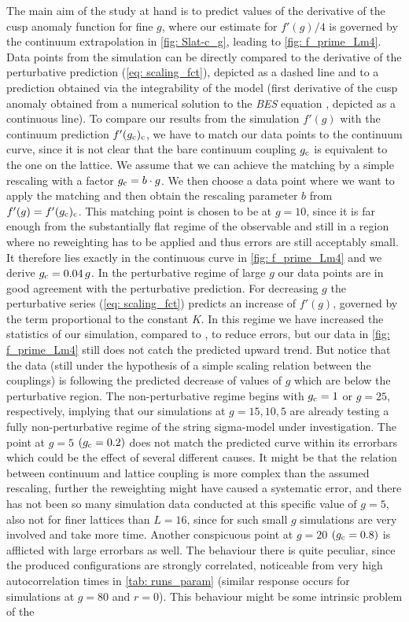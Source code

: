 The main aim of the study at hand is to predict values  of the derivative of the cusp anomaly function for fine $g$, where our estimate for $f'(g)/4$ is governed by the continuum extrapolation in \autoref{fig: Slat-c_g}, leading to \autoref{fig: f_prime_Lm4}. Data points from the simulation can be directly compared to the derivative of the perturbative prediction (\ref{eq: scaling_fct}), depicted as a dashed line and to a prediction obtained via the integrability of the model (first derivative of the cusp anomaly obtained from a numerical solution to the \textit{BES} equation \cite{Beisert:2006ez}, depicted as a continuous line). To compare our results from the simulation $f'(g)$ with the continuum prediction $f'(g_{\rm c})_{\rm c}$, we have to match our data points to the continuum curve, since it is not clear that the bare continuum coupling $g_{\rm c}$ is equivalent to the one on the lattice. We assume that we can achieve the matching by a simple rescaling with a factor $g_{\rm c}= b\cdot g$. We then choose a data point where we want to apply the matching and then obtain the rescaling parameter $b$ from $f'(g)=f'(g_{\rm c})_{\rm c}$. This matching point is chosen to be at $g=10$, since it is far enough from the substantially flat regime of the observable and still in a region where no reweighting has to be applied and thus errors are still acceptably small. It therefore lies exactly in the continuous curve in \autoref{fig: f_prime_Lm4} and we derive $g_{\rm c}=0.04 \,g$. In the perturbative regime of large $g$ our data points are in good agreement with the perturbative prediction. For decreasing $g$ the perturbative series (\ref{eq: scaling_fct}) predicts an increase of $f'(g)$, governed by the term proportional to the  constant $K$. In this regime we have increased the statistics of our simulation, compared to \cite{Bianchi:2016cyv}, to reduce errors, but our data in \autoref{fig: f_prime_Lm4} still does not catch the predicted upward trend. But notice that the data (still under the hypothesis of a simple scaling relation between the couplings) is following the predicted decrease of values of $g$ which are below the perturbative region. The non-perturbative regime begins with $g_{\rm c}=1$ or $g=25$, respectively, implying that our simulations at $g=15,10,5$ are already testing a fully non-perturbative regime of the string sigma-model under investigation. The point at $g=5$ $(g_{\rm c}=0.2)$ does not match the predicted curve within its errorbars which could be the effect of several different causes. It might be that the relation between continuum and lattice coupling is more complex than the assumed rescaling, further the reweighting might have caused a systematic error, and there has not been so many simulation data conducted at this specific value of $g=5$, also not for finer lattices than $L=16$, since for such small $g$ simulations are very involved and take more time. Another conspicuous point at $g=20$ $(g_{\rm c}=0.8)$ is afflicted with large errorbars as well. The behaviour there is quite peculiar, since the produced configurations are strongly correlated, noticeable from very high autocorrelation times in \autoref{tab: runs_param} (similar response occurs for simulations at $g=80$ and $r=0$). This behaviour might be some intrinsic problem of the 